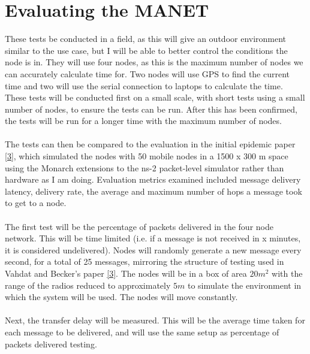 \documentclass[10pt, a4paper]{article}
\begin{document}
\section*{Evaluating the MANET}
These tests be conducted in a field, as this will give an outdoor environment similar to the use case, but I will be able to better control the conditions the node is in. They will use four nodes, as this is the maximum number of nodes we can accurately calculate time for. Two nodes will use GPS to find the current time and two will use the serial connection to laptops to calculate the time. These tests will be conducted first on a small scale, with short tests using a small number of nodes, to ensure the tests can be run. After this has been confirmed, the tests will be run for a longer time with the maximum number of nodes. \\  \\
The tests can then be compared to the evaluation in the initial epidemic paper \hyperref[epidemic]{[3]}, which simulated the nodes with 50 mobile nodes in a 1500 x 300 m space using the Monarch extensions to the ns-2 packet-level simulator rather than hardware as I am doing. Evaluation metrics examined included message delivery latency, delivery rate, the average and maximum number of hops a message took to get to a node.\\ \\
The first test will be the percentage of packets delivered in the four node network. This will be time limited (i.e. if a message is not received in x minutes, it is considered undelivered). Nodes will randomly generate a new message every second, for a total of 25 messages, mirroring the structure of testing used in Vahdat and Becker's paper \hyperref[epidemic]{[3]}. The nodes will be in a box of area $20m^2$ with the range of the radios reduced to approximately $5m$ to simulate the environment in which the system will be used. The nodes will move constantly. \\  \\ 
Next, the transfer delay will be measured. This will be the average time taken for each message to be delivered, and will use the same setup as percentage of packets delivered testing. \\
\end{document}

